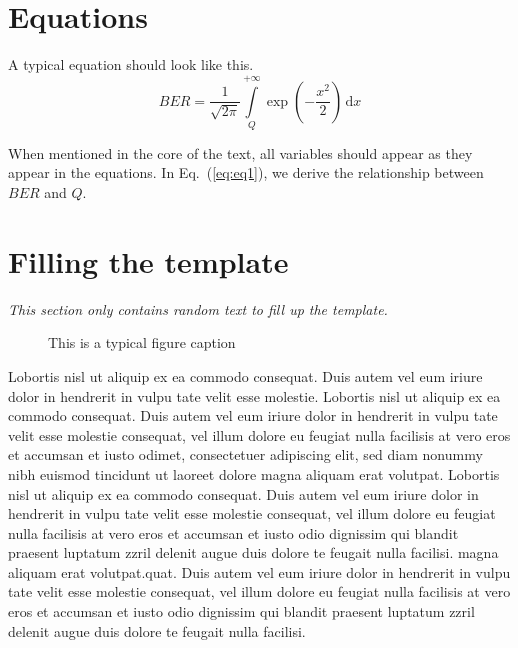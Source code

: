 \documentclass[a4paper, oneside, twocolumn, notitlepage, 10pt]{style/extarticle_ecoc2015}
\begin{document}
\section{Equations}
A typical equation should look like this. 
\begin{equation}\label{eq:eq1}
BER=\frac{1}{\sqrt{2\pi}}\int\limits_{Q}^{+\infty}\exp{\left(-\frac{x^2}{2}\right)}\,\mathrm{d}x
\end{equation}

When mentioned in the core of the text, all variables should appear as they appear in the equations. In Eq.~(\ref{eq:eq1}), we derive the relationship between $BER$ and $Q$. 


\section{Filling the template}

{\it This section only contains random text to fill up the
template.}


\begin{figure*}
   \centering
    \caption{This is a typical figure caption}
    \label{fig:figure2}
\end{figure*}

Lobortis nisl ut aliquip ex ea commodo consequat. Duis autem vel eum
iriure dolor in hendrerit in vulpu tate velit esse molestie.
Lobortis nisl ut aliquip ex ea commodo consequat. Duis autem vel eum
iriure dolor in hendrerit in vulpu tate velit esse molestie
consequat, vel illum dolore eu feugiat nulla facilisis at vero eros
et accumsan et iusto odimet, consectetuer adipiscing elit, sed diam
nonummy nibh euismod tincidunt ut laoreet dolore magna aliquam erat
volutpat. Lobortis nisl ut aliquip ex ea commodo consequat. Duis
autem vel eum iriure dolor in hendrerit in vulpu tate velit esse
molestie consequat, vel illum dolore eu feugiat nulla facilisis at
vero eros et accumsan et iusto odio dignissim qui blandit praesent
luptatum zzril delenit augue duis dolore te feugait nulla facilisi.
magna aliquam erat volutpat.quat. Duis autem vel eum iriure dolor in
hendrerit in vulpu tate velit esse molestie consequat, vel illum
dolore eu feugiat nulla facilisis at vero eros et accumsan et iusto
odio dignissim qui blandit praesent luptatum zzril delenit augue
duis dolore te feugait nulla facilisi.
\end{document}
